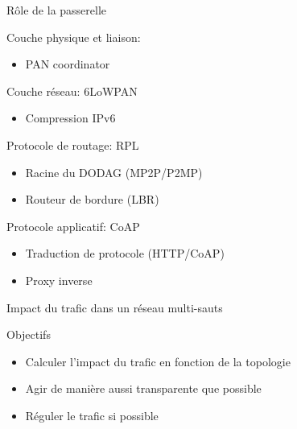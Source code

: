 \begin{frame}{Rôle de la passerelle}
  \begin{block}{Couche physique et liaison: \ieee{}}
    \begin{itemize}
      \item PAN coordinator
    \end{itemize}
  \end{block}
  \begin{block}{Couche réseau: 6LoWPAN}
    \begin{itemize}
      \item Compression IPv6
    \end{itemize}
  \end{block}
  \begin{alertblock}{Protocole de routage: RPL}
    \begin{itemize}
      \item Racine du DODAG (MP2P/P2MP)
      \item Routeur de bordure (LBR)
    \end{itemize}
  \end{alertblock}
  \begin{alertblock}{Protocole applicatif: CoAP}
    \begin{itemize}
      \item Traduction de protocole (HTTP/CoAP)
      \item Proxy inverse
    \end{itemize}
  \end{alertblock}
\end{frame}

\begin{frame}{Impact du trafic dans un réseau multi-sauts}
  \begin{figure}
    
  \end{figure}
  \begin{block}{Objectifs}
    \begin{itemize}
      \item Calculer l'impact du trafic en fonction de la topologie
      \item Agir de manière aussi transparente que possible
      \item Réguler le trafic si possible
    \end{itemize}
  \end{block}
\end{frame}

